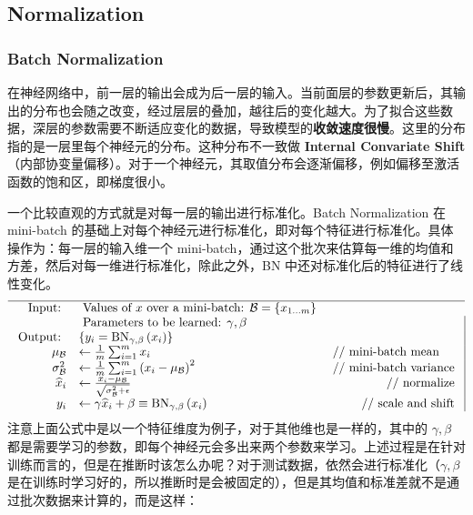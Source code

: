 \subsection{Normalization}
\subsubsection{Batch Normalization}
在神经网络中，前一层的输出会成为后一层的输入。当前面层的参数更新后，其输出的分布也会随之改变，经过层层的叠加，越往后的变化越大。为了拟合这些数据，深层的参数需要不断适应变化的数据，导致模型的\textbf{收敛速度很慢}。这里的分布指的是一层里每个神经元的分布。这种分布不一致做 \textbf{Internal Convariate Shift}（内部协变量偏移）。对于一个神经元，其取值分布会逐渐偏移，例如偏移至激活函数的饱和区，即梯度很小。

一个比较直观的方式就是对每一层的输出进行标准化。Batch Normalization 在 mini-batch 的基础上对每个神经元进行标准化，即对每个特征进行标准化。具体操作为：每一层的输入维一个 mini-batch，通过这个批次来估算每一维的均值和方差，然后对每一维进行标准化，除此之外，BN 中还对标准化后的特征进行了线性变化。
$$
\begin{array}{rlr|}
	\hline \text { Input: } & \text { Values of } x \text { over a mini-batch: } \mathcal{B}=\left\{x_{1 \ldots m}\right\} \\
	& \text { Parameters to be learned: } \gamma, \beta & \\
	\text { Output: } & \left\{y_{i}=\operatorname{BN}_{\gamma, \beta}\left(x_{i}\right)\right\} & \\
	\mu_{\mathcal{B}} & \leftarrow \frac{1}{m} \sum_{i=1}^{m} x_{i} & \multicolumn{1}{l|}{\text { // mini-batch mean }} \\
	\sigma_{\mathcal{B}}^{2} & \leftarrow \frac{1}{m} \sum_{i=1}^{m}\left(x_{i}-\mu_{\mathcal{B}}\right)^{2} & \text { // mini-batch variance } \\
	\widehat{x}_{i} & \leftarrow \frac{x_{i}-\mu_{\mathcal{B}}}{\sqrt{\sigma_{\mathcal{B}}^{2}+\epsilon}} & \text { // normalize } \\
	y_{i} & \leftarrow \gamma \widehat{x}_{i}+\beta \equiv \mathrm{BN}_{\gamma, \beta}\left(x_{i}\right) & \text { // scale and shift }
\end{array}
$$
注意上面公式中是以一个特征维度为例子，对于其他维也是一样的，其中的 $\gamma, \beta$ 都是需要学习的参数，即每个神经元会多出来两个参数来学习。上述过程是在针对训练而言的，但是在推断时该怎么办呢？对于测试数据，依然会进行标准化（$\gamma, \beta$ 是在训练时学习好的，所以推断时是会被固定的），但是其均值和标准差就不是通过批次数据来计算的，而是这样：
